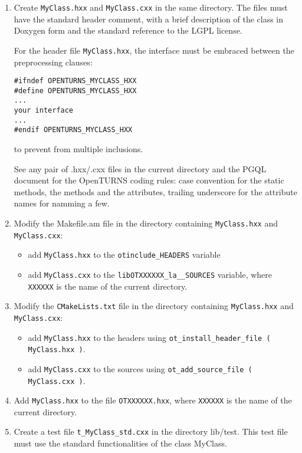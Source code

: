 \documentclass[11pt]{article}
\begin{document}
\begin{enumerate}
\item Create \verb!MyClass.hxx! and \verb!MyClass.cxx! in the same directory. The files must have the standard header comment, with a brief description of the class in Doxygen form and the standard reference to the LGPL license.
  
  For the header file \verb!MyClass.hxx!, the interface must be embraced between the preprocessing clauses:
  
\begin{verbatim}
#ifndef OPENTURNS_MYCLASS_HXX
#define OPENTURNS_MYCLASS_HXX
...
your interface
...
#endif OPENTURNS_MYCLASS_HXX
\end{verbatim}
  
  to prevent from multiple inclusions.
  
  See any pair of .hxx/.cxx files in the current directory and the PGQL document for the OpenTURNS coding rules: case convention for the static methods, the methods and the attributes, trailing underscore for the attribute names for namming a few.
  
\item Modify the Makefile.am file in the directory containing \verb!MyClass.hxx! and \verb!MyClass.cxx!:
  \begin{itemize}
  \item add \verb!MyClass.hxx! to the \verb!otinclude_HEADERS! variable
  \item add \verb!MyClass.cxx! to the \verb!libOTXXXXXX_la__SOURCES! variable, where \verb!XXXXXX! is the name of the current directory.
  \end{itemize}
  
\item Modify the \verb!CMakeLists.txt! file in the directory containing \verb!MyClass.hxx! and \verb!MyClass.cxx!:
  \begin{itemize}
  \item add \verb!MyClass.hxx! to the headers using \verb!ot_install_header_file ( MyClass.hxx )!.
  \item add \verb!MyClass.cxx! to the sources using \verb!ot_add_source_file ( MyClass.cxx )!.
  \end{itemize}
  
\item Add \verb!MyClass.hxx! to the file \verb!OTXXXXXX.hxx!, where \verb!XXXXXX! is the name of the current directory.
  
\item Create a test file \verb!t_MyClass_std.cxx! in the directory lib/test. This test file must use the standard functionalities of the class MyClass.


\end{enumerate}
\end{document}
